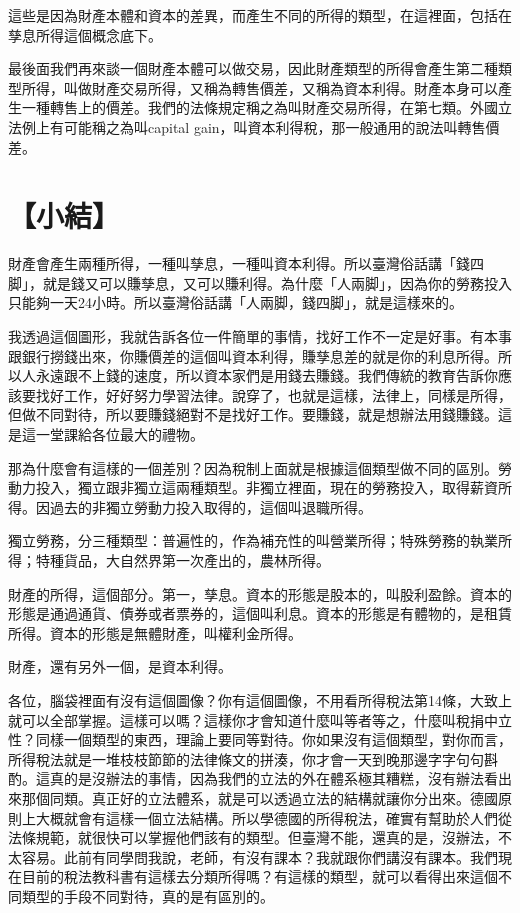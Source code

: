 \documentclass[]{ctexbook}
\begin{document}
這些是因為財產本體和資本的差異，而產生不同的所得的類型，在這裡面，包括在孳息所得這個概念底下。

最後面我們再來談一個財產本體可以做交易，因此財產類型的所得會產生第二種類型所得，叫做財產交易所得，又稱為轉售價差，又稱為資本利得。財產本身可以產生一種轉售上的價差。我們的法條規定稱之為叫財產交易所得，在第七類。外國立法例上有可能稱之為叫capital gain，叫資本利得稅，那一般通用的說法叫轉售價差。

\hypertarget{ux5c0fux7d50-1}{%
\section{【小結】}\label{ux5c0fux7d50-1}}

財產會產生兩種所得，一種叫孳息，一種叫資本利得。所以臺灣俗話講「錢四脚」，就是錢又可以賺孳息，又可以賺利得。為什麼「人兩脚」，因為你的勞務投入只能夠一天24小時。所以臺灣俗話講「人兩脚，錢四脚」，就是這樣來的。

我透過這個圖形，我就告訴各位一件簡單的事情，找好工作不一定是好事。有本事跟銀行撈錢出來，你賺價差的這個叫資本利得，賺孳息差的就是你的利息所得。所以人永遠跟不上錢的速度，所以資本家們是用錢去賺錢。我們傳統的教育告訴你應該要找好工作，好好努力學習法律。說穿了，也就是這樣，法律上，同樣是所得，但做不同對待，所以要賺錢絕對不是找好工作。要賺錢，就是想辦法用錢賺錢。這是這一堂課給各位最大的禮物。

那為什麼會有這樣的一個差別？因為稅制上面就是根據這個類型做不同的區別。勞動力投入，獨立跟非獨立這兩種類型。非獨立裡面，現在的勞務投入，取得薪資所得。因過去的非獨立勞動力投入取得的，這個叫退職所得。

獨立勞務，分三種類型：普遍性的，作為補充性的叫營業所得；特殊勞務的執業所得；特種貨品，大自然界第一次產出的，農林所得。

財產的所得，這個部分。第一，孳息。資本的形態是股本的，叫股利盈餘。資本的形態是通過通貨、債券或者票券的，這個叫利息。資本的形態是有體物的，是租賃所得。資本的形態是無體財產，叫權利金所得。

財產，還有另外一個，是資本利得。

各位，腦袋裡面有沒有這個圖像？你有這個圖像，不用看所得稅法第14條，大致上就可以全部掌握。這樣可以嗎？這樣你才會知道什麼叫等者等之，什麼叫稅捐中立性？同樣一個類型的東西，理論上要同等對待。你如果沒有這個類型，對你而言，所得稅法就是一堆枝枝節節的法律條文的拼湊，你才會一天到晚那邊字字句句斟酌。這真的是沒辦法的事情，因為我們的立法的外在體系極其糟糕，沒有辦法看出來那個同類。真正好的立法體系，就是可以透過立法的結構就讓你分出來。德國原則上大概就會有這樣一個立法結構。所以學德國的所得稅法，確實有幫助於人們從法條規範，就很快可以掌握他們該有的類型。但臺灣不能，還真的是，沒辦法，不太容易。此前有同學問我說，老師，有沒有課本？我就跟你們講沒有課本。我們現在目前的稅法教科書有這樣去分類所得嗎？有這樣的類型，就可以看得出來這個不同類型的手段不同對待，真的是有區別的。
\end{document}
